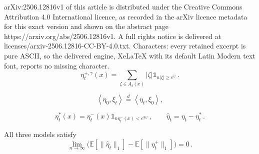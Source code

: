 \documentclass[10pt,a4paper]{amsart}
\let\g=\gamma \let\h=\eta    \let\k=\kappa  \let\l=\lambda
\newcommand{\E}{\mathds{E}}
\newcommand{\car}{\mathds{1}}
\newcommand{\scalar}[2]{\left\langle #1, #2 \right\rangle}
\begin{document}
arXiv:2506.12816v1 of this article is distributed under the Creative Commons Attribution 4.0 International licence, as recorded in the arXiv licence metadata for this exact version and shown on the abstract page https://arxiv.org/abs/2506.12816v1. A full rights notice is delivered at licenses/arxiv-2506.12816-CC-BY-4.0.txt. Characters: every retained excerpt is pure ASCII, so the delivered engine, XeLaTeX with its default Latin Modern text font, reports no missing character.
\begin{equation}\label{eq:def-eta+g}
\eta_t^{+,\g}(x)=\sum_{\zeta\in A_t(x)} |\zeta|\car_{n|\zeta|\ge e^{\psi}}\,.
\end{equation}

\begin{equation}\label{eq:dual}
	\scalar{\eta_0}{\xi_t}\overset{d}{=}\scalar{\eta_t}{\xi_0} ,
\end{equation}

\begin{equation}\label{eq:def-eta-star}
		\eta_{t}^*(x)=\eta_{t}^-(x)\car_{n\eta_{t}^-(x)< e^{3\psi}}\,,\qquad \widehat \eta_t = \eta_{t}-\eta_{t}^{*}\,.
	\end{equation}

	\begin{lemma}\label{lemma:eta*B}
	All three models satisfy
		\begin{equation}\label{eq:topro}
			\lim_{n\to\infty}\big(\E[\|\widehat\eta_{t}\|_1]-\E[\|\eta^+_{t}\|_1]\big)=0\,.
		\end{equation}
	\end{lemma}
\end{document}
